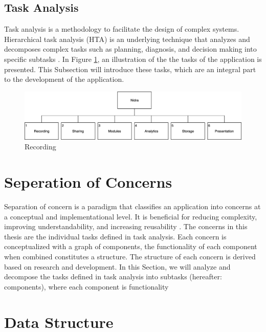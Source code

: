 \subsection{Task Analysis}
Task analysis is a methodology to facilitate the design of complex systems. Hierarchical task analysis (HTA) is an underlying technique that analyzes and decomposes complex tasks such as planning, diagnosis, and decision making into specific subtasks \cite{ta}. In Figure \ref{fig:hta_overview}, an illustration of the the tasks of the application is presented. This Subsection will introduce these tasks, which are an integral part to the development of the application.

\begin{figure}
    \centering
    \includegraphics[scale=0.23]{images/TA.png}
    \caption{Recording}
    \label{fig:hta_overview}
\end{figure}



\section{Seperation of Concerns}
Separation of concern is a paradigm that classifies an application into concerns at a conceptual and implementational level. It is beneficial for reducing complexity, improving understandability, and increasing reusability \cite{soc}. The concerns in this thesis are the individual tasks defined in task analysis. Each concern is conceptualized with a graph of components, the functionality of each component when combined constitutes a structure. The structure of each concern is derived based on research and development. In this Section, we will analyze and decompose the tasks defined in task analysis into subtasks (hereafter: components), where each component is functionality   



\section{Data Structure}

